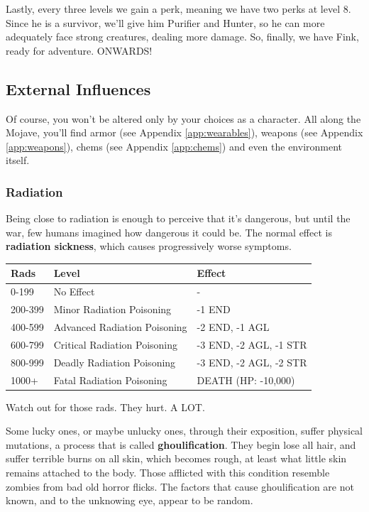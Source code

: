 \documentclass[11pt]{article} %
\begin{document}
Lastly, every three levels we gain a perk, meaning we have two perks at level 8. Since he is a survivor, we'll give him Purifier and Hunter, so he can more adequately face strong creatures, dealing more damage. So, finally, we have Fink, ready for adventure. ONWARDS!

\subsection{External Influences}

Of course, you won't be altered only by your choices as a character. All along the Mojave, you'll find armor (see Appendix \ref{app:wearables}), weapons (see Appendix \ref{app:weapons}), chems (see Appendix \ref{app:chems}) and even the environment itself.

\subsubsection{Radiation}

Being close to radiation is enough to perceive that it's dangerous, but until the war, few humans imagined how dangerous it could be. The normal effect is \textbf{radiation sickness}, which causes progressively worse symptoms.

\begin{longtable}{|p{3.3cm}|p{3.1cm}|p{4.3cm}|}
\hline
\bfseries Rads & \bfseries Level & \bfseries Effect \\
\hline
\endhead
0-199 &	No Effect & - \\	
200-399 & Minor Radiation Poisoning & -1 END \\
400-599 & Advanced Radiation Poisoning & -2 END, -1 AGL \\
600-799 & Critical Radiation Poisoning & -3 END, -2 AGL, -1 STR \\
800-999 & Deadly Radiation Poisoning & -3 END, -2 AGL, -2 STR \\
1000+ & Fatal Radiation Poisoning & DEATH (HP: -10,000) \\
\hline
\end{longtable}{\begin{center}Watch out for those rads. They hurt. A LOT.\end{center}}

Some lucky ones, or maybe unlucky ones, through their exposition, suffer physical mutations, a process that is called \textbf{ghoulification}. They begin lose all hair, and suffer terrible burns on all skin, which becomes rough, at least what little skin remains attached to the body. Those afflicted with this condition resemble zombies from bad old horror flicks. The factors that cause ghoulification are not known, and to the unknowing eye, appear to be random.
\end{document}

